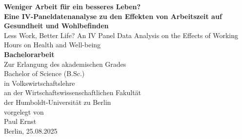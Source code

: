 \documentclass[12pt,a4paper]{article}
\begin{document}
\begin{titlepage}
    \centering
    \vspace*{2cm}
    {\Large\bfseries Weniger Arbeit für ein besseres Leben?\\[0.4cm]
    \large Eine IV-Paneldatenanalyse zu den Effekten von Arbeitszeit auf Gesundheit und Wohlbefinden} \\[1cm]
    \normalsize{Less Work, Better Life? An IV Panel Data Analysis on the Effects of Working Hours on Health and Well-being}\\[1.5cm]
    {\large\bfseries Bachelorarbeit}\\[1.2cm]
    Zur Erlangung des akademischen Grades \\
    Bachelor of Science (B.Sc.) \\ [0.5cm]
    in Volkswirtschaftslehre \\[0.5cm]
    an der Wirtschaftswissenschaftlichen Fakultät \\ 
    der Humboldt-Universität zu Berlin \\ [1.2cm]
    vorgelegt von\\[0.2cm]
    Paul Ernst\\[0.2cm]
    Berlin, 25.08.2025
\end{titlepage}



\clearpage
\begin{abstract}
\noindent Diese Arbeit untersucht die kausalen Effekte der tatsächlich geleisteten Wochenarbeitszeit auf Gesundheit und Wohlbefinden von Erwerbstätigen in Deutschland. Grundlage ist das Sozio-oekonomische Panel (SOEP, 1994–2022), kombiniert mit einem Bartik-basierten Instrumentenvariablenansatz zur Adressierung der Endogenität der Arbeitszeit. Die Ergebnisse zeigen, dass längere Arbeitszeiten den selbst eingeschätzten Gesundheitszustand leicht verbessern. Für Lebenszufriedenheit und Freizeitzufriedenheit lassen sich keine signifikanten Effekte nachweisen. Subgruppenanalysen verdeutlichen, dass positive Effekte vor allem bei Männern, Vollzeitbeschäftigten und Besserverdienenden auftreten. Die Befunde widersprechen damit einem Großteil der bisherigen Literatur und deuten darauf hin, dass die Wirkung von Arbeitszeit stark vom sozioökonomischen Kontext abhängt.    
\end{abstract}


\end{document}

